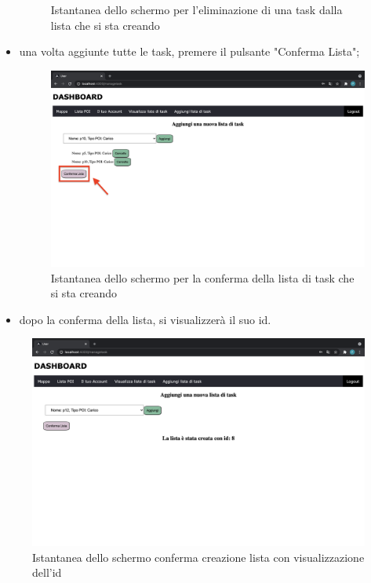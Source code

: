 \begin{itemize}
\begin{figure}[H]
        \caption{Istantanea dello schermo per l'eliminazione di una task dalla lista che si sta creando}
    \end{figure}
    \item una volta aggiunte tutte le task, premere il pulsante "Conferma Lista";
    \begin{figure}[H]
        \centering
        \includegraphics[scale=0.12]{res/images/confermalista.png}
        \caption{Istantanea dello schermo per la conferma della lista di task che si sta creando}
    \end{figure}
    \item dopo la conferma della lista, si visualizzerà il suo id.
    
\end{itemize}
\begin{figure}[H]
    \centering
    \includegraphics[scale=0.2]{res/images/listacreata.png}
    \caption{Istantanea dello schermo conferma creazione lista con visualizzazione dell'id}
\end{figure}

